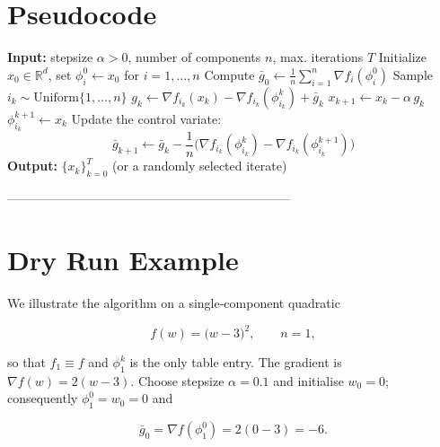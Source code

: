 \documentclass{article}
\newcommand{\R}{\mathbb{R}}
\begin{document}
\section*{Pseudocode}
\begin{algorithm}[H]
\caption{SAGA (non‑convex version)}
\begin{algorithmic}[1]
\State \textbf{Input:} stepsize $\alpha>0$, number of components $n$, max. iterations $T$
\State Initialize $x_0\in\R^{d}$, set $\phi_i^0\gets x_0$ for $i=1,\dots ,n$
\State Compute $\bar g_0\gets \frac1n\sum_{i=1}^{n}\nabla f_i(\phi_i^0)$
    \State Sample $i_k\sim\text{Uniform}\{1,\dots ,n\}$
    \State $g_k \gets \nabla f_{i_k}(x_k)-\nabla f_{i_k}(\phi_{i_k}^k)+\bar g_k$
    \State $x_{k+1}\gets x_k-\alpha\,g_k$ 
    \State $\phi_{i_k}^{k+1}\gets x_k$ 
    \State Update the control variate:
          \[
          \bar g_{k+1}\gets \bar g_k
                 -\frac{1}{n}\bigl(\nabla f_{i_k}(\phi_{i_k}^k)-\nabla f_{i_k}(\phi_{i_k}^{k+1})\bigr)
          \]
\EndFor
\State \textbf{Output:} $\{x_k\}_{k=0}^{T}$ (or a randomly selected iterate)
\end{algorithmic}
\end{algorithm}

--------------------------------------------------------------------

\section*{Dry Run Example}
We illustrate the algorithm on a single‑component quadratic  

\[
f(w)=\bigl(w-3\bigr)^2,\qquad n=1,
\]

so that $f_1\equiv f$ and $\phi_1^k$ is the only table entry.
The gradient is $\nabla f(w)=2(w-3)$.  
Choose stepsize $\alpha=0.1$ and initialise $w_0=0$; consequently $\phi_1^0=w_0=0$ and  

\[
\bar g_0=\nabla f(\phi_1^0)=2(0-3)=-6 .
\]
\end{document}
